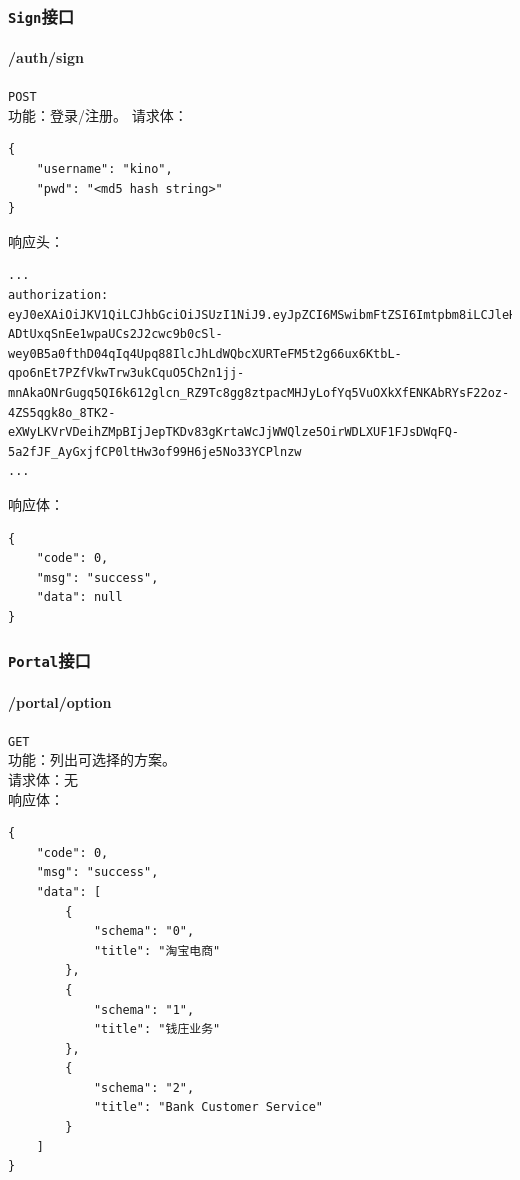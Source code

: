 \documentclass[hyperref]{ctexart}
\begin{document}
\subsubsection{\texttt{Sign}接口}
\paragraph{/auth/sign} \texttt{POST}\\
功能：登录/注册。
请求体：
\begin{lstlisting}
{
    "username": "kino",
    "pwd": "<md5 hash string>"
}
\end{lstlisting}
响应头：
\begin{lstlisting}
...
authorization: eyJ0eXAiOiJKV1QiLCJhbGciOiJSUzI1NiJ9.eyJpZCI6MSwibmFtZSI6Imtpbm8iLCJleHAiOjE2Mzk1OTI1NTMsImRldGFpbCI6bnVsbH0.zYoOaElK4wKbKiADwUkXfabzRc0oi1YIb6-ADtUxqSnEe1wpaUCs2J2cwc9b0cSl-wey0B5a0fthD04qIq4Upq88IlcJhLdWQbcXURTeFM5t2g66ux6KtbL-qpo6nEt7PZfVkwTrw3ukCquO5Ch2n1jj-mnAkaONrGugq5QI6k612glcn_RZ9Tc8gg8ztpacMHJyLofYq5VuOXkXfENKAbRYsF22oz-4ZS5qgk8o_8TK2-eXWyLKVrVDeihZMpBIjJepTKDv83gKrtaWcJjWWQlze5OirWDLXUF1FJsDWqFQ-5a2fJF_AyGxjfCP0ltHw3of99H6je5No33YCPlnzw
...
\end{lstlisting}
响应体：
\begin{lstlisting}
{
    "code": 0,
    "msg": "success",
    "data": null
}
\end{lstlisting}
\subsubsection{\texttt{Portal}接口}
\paragraph{/portal/option} \texttt{GET}\\
功能：列出可选择的方案。\\
请求体：无\\
响应体：
\begin{lstlisting}
{
    "code": 0,
    "msg": "success",
    "data": [
        {
            "schema": "0",
            "title": "淘宝电商"
        },
        {
            "schema": "1",
            "title": "钱庄业务"
        },
        {
            "schema": "2",
            "title": "Bank Customer Service"
        }
    ]
}
\end{lstlisting}
\end{document}
